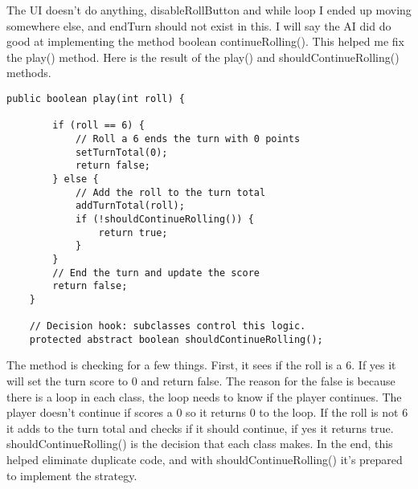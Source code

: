 \documentclass[a4paper,11pt]{article}
\begin{document}
The UI doesn't do anything, disableRollButton and while loop I ended up moving somewhere else, and endTurn should not exist in this. I will say the AI did do good at implementing the method boolean continueRolling(). This helped me fix the play() method. Here is the result of the play() and shouldContinueRolling() methods.
\begin{lstlisting}
public boolean play(int roll) {
 
        if (roll == 6) {
            // Roll a 6 ends the turn with 0 points
            setTurnTotal(0);
            return false;
        } else {
            // Add the roll to the turn total
            addTurnTotal(roll);
            if (!shouldContinueRolling()) {
                return true;
            }
        }
        // End the turn and update the score
        return false;
    }

    // Decision hook: subclasses control this logic.
    protected abstract boolean shouldContinueRolling();
\end{lstlisting}
The method is checking for a few things. First, it sees if the roll is a 6. If yes it will set the turn score to 0 and return false. The reason for the false is because there is a loop in each class, the loop needs to know if the player continues. The player doesn't continue if scores a 0 so it returns 0 to the loop. If the roll is not 6 it adds to the turn total and checks if it should continue, if yes it returns true. shouldContinueRolling() is the decision that each class makes. In the end, this helped eliminate duplicate code, and with shouldContinueRolling() it's prepared to implement the strategy.
\end{document}
